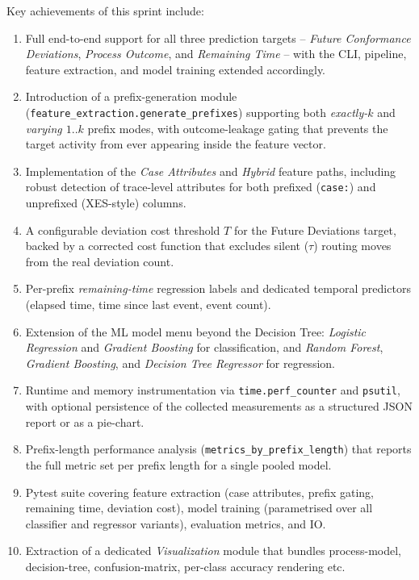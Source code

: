 \documentclass[12pt,a4paper]{article}
\begin{document}
Key achievements of this sprint include:
\begin{enumerate}
	\item Full end-to-end support for all three prediction targets -- \textit{Future Conformance Deviations}, \textit{Process Outcome}, and \textit{Remaining Time} -- with the CLI, pipeline, feature extraction, and model training extended accordingly.
	\item Introduction of a prefix-generation module (\texttt{feature\_extraction.generate\_prefixes}) supporting both \textit{exactly-$k$} and \textit{varying $1..k$} prefix modes, with outcome-leakage gating that prevents the target activity from ever appearing inside the feature vector.
	\item Implementation of the \textit{Case Attributes} and \textit{Hybrid} feature paths, including robust detection of trace-level attributes for both prefixed (\texttt{case:}) and unprefixed (XES-style) columns.
	\item A configurable deviation cost threshold $T$ for the Future Deviations target, backed by a corrected cost function that excludes silent ($\tau$) routing moves from the real deviation count.
	\item Per-prefix \textit{remaining-time} regression labels and dedicated temporal predictors (elapsed time, time since last event, event count).
	\item Extension of the ML model menu beyond the Decision Tree: \textit{Logistic Regression} and \textit{Gradient Boosting} for classification, and \textit{Random Forest}, \textit{Gradient Boosting}, and \textit{Decision Tree Regressor} for regression.
	\item Runtime and memory instrumentation via \texttt{time.perf\_counter} and \texttt{psutil}, with optional persistence of the collected measurements as a structured JSON report or as a pie-chart.
	\item Prefix-length performance analysis (\texttt{metrics\_by\_prefix\_length}) that reports the full metric set per prefix length for a single pooled model.
	\item  Pytest suite covering feature extraction (case attributes, prefix gating, remaining time, deviation cost), model training (parametrised over all classifier and regressor variants), evaluation metrics, and IO.
	\item Extraction of a dedicated \textit{Visualization} module that bundles process-model, decision-tree, confusion-matrix, per-class accuracy rendering etc.
\end{enumerate}
\end{document}
